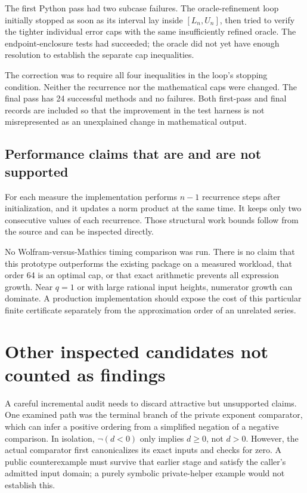 \documentclass[11pt,a4paper]{article}
\theoremstyle{remark}\newtheorem{remark}[theorem]{Remark}
\begin{document}
The first Python pass had two subcase failures. The oracle-refinement loop
initially stopped as soon as its interval lay inside $[L_n,U_n]$, then tried to
verify the tighter individual error caps with the same insufficiently refined
oracle. The endpoint-enclosure tests had succeeded; the oracle did not yet have
enough resolution to establish the separate cap inequalities.

The correction was to require all four inequalities in the loop's stopping
condition. Neither the recurrence nor the mathematical caps were changed.
The final pass has 24 successful methods and no failures. Both first-pass and
final records are included so that the improvement in the test harness is not
misrepresented as an unexplained change in mathematical output.

\subsection{Performance claims that are and are not supported}

For each measure the implementation performs $n-1$ recurrence steps after
initialization, and it updates a norm product at the same time. It keeps only
two consecutive values of each recurrence. Those structural work bounds follow
from the source and can be inspected directly.

No Wolfram-versus-Mathics timing comparison was run. There is no claim that this
prototype outperforms the existing package on a measured workload, that order
64 is an optimal cap, or that exact arithmetic prevents all expression growth.
Near $q=1$ or with large rational input heights, numerator growth can dominate.
A production implementation should expose the cost of this particular finite
certificate separately from the approximation order of an unrelated series.

\section{Other inspected candidates not counted as findings}
\label{sec:negative}

A careful incremental audit needs to discard attractive but unsupported claims.
One examined path was the terminal branch of the private exponent comparator,
which can infer a positive ordering from a simplified negation of a negative
comparison. In isolation, $\neg(d<0)$ only implies $d\geq0$, not $d>0$.
However, the actual comparator first canonicalizes its exact inputs and checks
for zero. A public counterexample must survive that earlier stage and satisfy
the caller's admitted input domain; a purely symbolic private-helper example
would not establish this.\cite{maincore}
\end{document}
